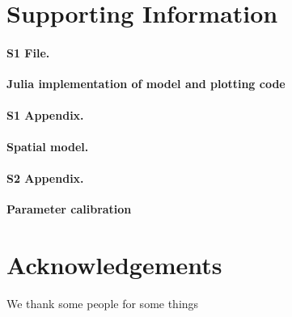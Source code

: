 \documentclass[10pt,letterpaper]{article}
\begin{document}
\section*{Supporting Information}

\paragraph*{S1 File.}
\label{S1_File}
{\bf Julia implementation of model and plotting code}  

\paragraph*{S1 Appendix.}
\label{S1_Appendix}
{\bf Spatial model.} 

\paragraph*{S2 Appendix.}
\label{S2_Appendix}
{\bf Parameter calibration} 

\section*{Acknowledgements}
We thank some people for some things

\nolinenumbers

%
% 
%




% 

\end{document}

